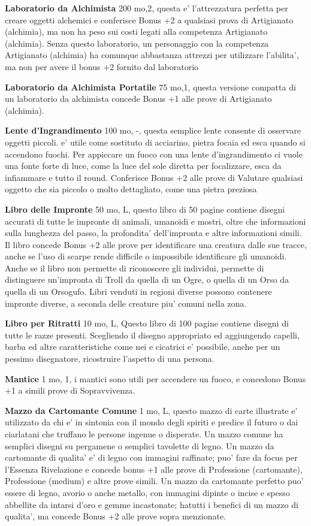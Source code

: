 \documentclass[a4paper,11pt,twoside,openany]{book}
\begin{document}
{		\textbf{Laboratorio da Alchimista} 200 mo,2,  questa e' l'attrezzatura perfetta per creare oggetti alchemici e conferisce Bonus +2 a qualsiasi prova di Artigianato (alchimia), ma non ha peso sui costi legati alla competenza Artigianato (alchimia). 
		Senza questo laboratorio, un personaggio con la competenza Artigianato (alchimia) ha comunque abbastanza attrezzi per utilizzare l'abilita', ma non per avere il bonus +2 fornito dal laboratorio
		
		\textbf{Laboratorio da Alchimista Portatile} 75 mo,1, questa versione compatta di un laboratorio da alchimista concede Bonus +1 alle prove di Artigianato (alchimia).
		
		\textbf{Lente d'Ingrandimento} 100 mo, -, questa semplice lente consente di osservare oggetti piccoli. e' utile come sostituto di acciarino, pietra focaia ed esca quando si accendono fuochi. 
		Per appiccare un fuoco con una lente d'ingrandimento ci vuole una fonte forte di luce, come la luce del sole diretta per focalizzare, esca da infiammare e tutto il round. Conferisce Bonus +2 alle prove di Valutare qualsiasi oggetto che sia piccolo o molto dettagliato, come una pietra preziosa 
		
		\textbf{Libro delle Impronte} 50 mo, L,  questo libro di 50 pagine contiene disegni accurati di tutte le impronte di animali, umanoidi e mostri, oltre che informazioni sulla lunghezza del passo, la profondita' dell'impronta e altre informazioni simili. Il libro concede Bonus +2 alle prove per identificare una creatura dalle sue tracce, anche se l'uso di scarpe rende difficile o impossibile identificare gli umanoidi. 
		Anche se il libro non permette di riconoscere gli individui, permette di distinguere un'impronta di Troll da quella di un Ogre, o quella di un Orso da quella di un Orsogufo. Libri venduti in regioni diverse possono contenere impronte diverse, a seconda delle creature piu' comuni nella zona.
		
		\textbf{Libro per Ritratti} 10 mo, L,  Questo libro di 100 pagine contiene disegni di tutte le razze presenti. Scegliendo il disegno appropriato ed aggiungendo capelli, barba ed altre caratteristiche come nei e cicatrici e' possibile, anche per un pessimo disegnatore, ricostruire l'aspetto di una persona.
		
		\textbf{Mantice} 1 mo, 1, i mantici sono utili per accendere un fuoco, e concedono Bonus +1 a simili prove di Sopravvivenza.
		
		\textbf{Mazzo da Cartomante Comune} 1 mo, L, questo mazzo di carte illustrate e' utilizzato da chi e' in sintonia con il mondo degli spiriti e predice il futuro o dai ciarlatani che truffano le persone ingenue o disperate. Un mazzo comune ha semplici disegni su pergamene o semplici tavolette di legno. 
		Un mazzo da cartomante di qualita' e' di legno con immagini raffinate; puo' fare da focus per l'Essenza Rivelazione e concede bonus +1 alle prove di Professione (cartomante), Professione (medium) e altre prove simili. 
		Un mazzo da cartomante perfetto puo' essere di legno, avorio o anche metallo, con immagini dipinte o incise e spesso abbellite da intarsi d'oro e gemme incastonate; hatutti i benefici di un mazzo di qualita', ma concede Bonus +2 alle prove sopra menzionate.
		
}
\end{document}
